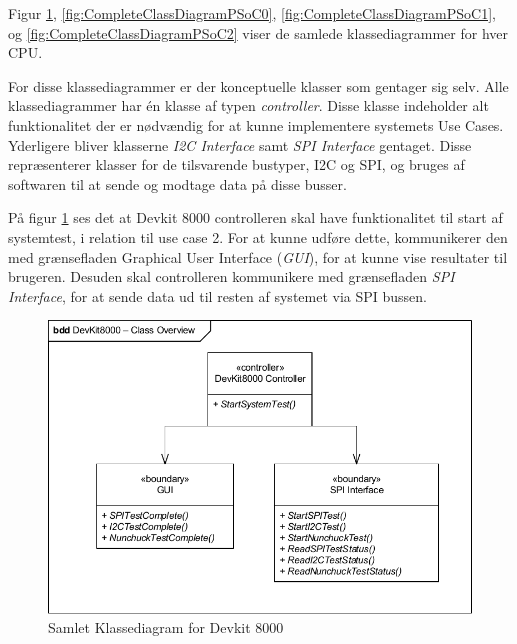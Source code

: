 \noindent Figur \ref{fig:CompleteClassDiagramDevKit8000}, \ref{fig:CompleteClassDiagramPSoC0}, \ref{fig:CompleteClassDiagramPSoC1}, og \ref{fig:CompleteClassDiagramPSoC2} viser de samlede klassediagrammer for hver CPU.\newline

\noindent For disse klassediagrammer er der konceptuelle klasser som gentager sig selv. Alle klassediagrammer har én klasse af typen \textit{controller}. Disse klasse indeholder alt funktionalitet der er nødvændig for at kunne implementere systemets Use Cases. Yderligere bliver klasserne \textit{I2C Interface} samt \textit{SPI Interface} gentaget. Disse repræsenterer klasser for de tilsvarende bustyper, I2C og SPI, og bruges af softwaren til at sende og modtage data på disse busser.\newline

\noindent På figur \ref{fig:CompleteClassDiagramDevKit8000} ses det at Devkit 8000 controlleren skal have funktionalitet til start af systemtest, i relation til use case 2. For at kunne udføre dette, kommunikerer den med grænsefladen Graphical User Interface (\textit{GUI}), for at kunne vise resultater til brugeren. Desuden skal controlleren kommunikere med grænsefladen \textit{SPI Interface}, for at sende data ud til resten af systemet via SPI bussen.
\begin{figure}[H]
	\centering
	\includegraphics[width=\textwidth] {Systemarkitektur/images/CompleteClassDiagramDevKit8000}
	\caption{Samlet Klassediagram for Devkit 8000}
	\label{fig:CompleteClassDiagramDevKit8000}
\end{figure}

